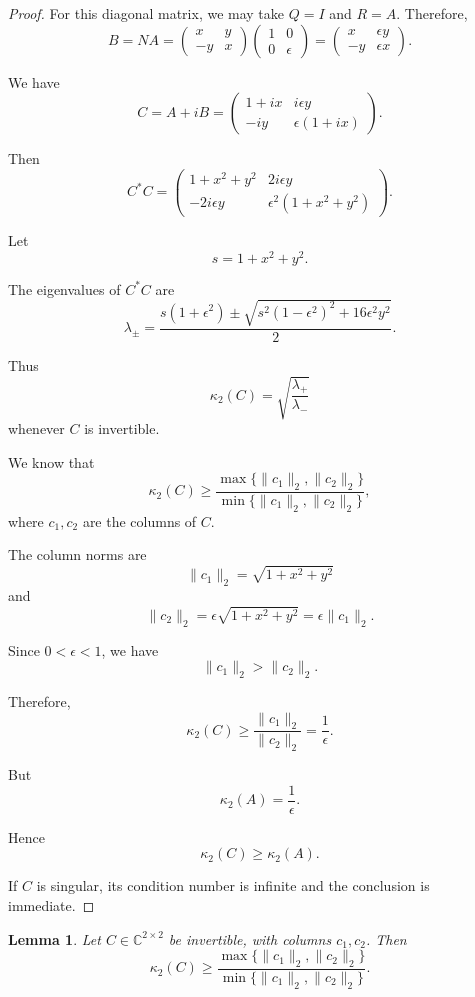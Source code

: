 \documentclass[11pt, reqno, a4paper]{amsart}
\theoremstyle{plain}
\newtheorem{lemma}[theorem]{Lemma}
\theoremstyle{definition}
\theoremstyle{remark}
\numberwithin{equation}{section}
\begin{document}
\begin{proof}
For this diagonal matrix, we may take $Q=I$ and $R=A$. Therefore,
\[
B=NA
=
\begin{pmatrix}
x&y\\
-y&x
\end{pmatrix}
\begin{pmatrix}
1&0\\
0&\epsilon
\end{pmatrix}
=
\begin{pmatrix}
x&\epsilon y\\
-y&\epsilon x
\end{pmatrix}.
\]

We have
\[
C=A+iB
=
\begin{pmatrix}
1+ix&i\epsilon y\\
-iy&\epsilon(1+ix)
\end{pmatrix}.
\]

Then
\[
C^*C
=
\begin{pmatrix}
1+x^2+y^2&2i\epsilon y\\
-2i\epsilon y&\epsilon^2(1+x^2+y^2)
\end{pmatrix}.
\]

Let
\[
s=1+x^2+y^2.
\]

The eigenvalues of $C^*C$ are
\[
\boxed{
\lambda_\pm
=
\frac{
s(1+\epsilon^2)
\pm
\sqrt{
s^2(1-\epsilon^2)^2+16\epsilon^2y^2
}
}{2}.
}
\]

Thus
\[
\kappa_2(C)=\sqrt{\frac{\lambda_+}{\lambda_-}}
\]
whenever $C$ is invertible.

We know that
\[
\kappa_2(C)
\geq
\frac{\max\{\|c_1\|_2,\|c_2\|_2\}}
{\min\{\|c_1\|_2,\|c_2\|_2\}},
\]
where $c_1,c_2$ are the columns of $C$.

The column norms are
\[
\|c_1\|_2
=
\sqrt{1+x^2+y^2}
\]
and
\[
\|c_2\|_2
=
\epsilon\sqrt{1+x^2+y^2}
=
\epsilon\|c_1\|_2.
\]

Since $0<\epsilon<1$, we have
\[
\|c_1\|_2>\|c_2\|_2.
\]

Therefore,
\[
\kappa_2(C)
\geq
\frac{\|c_1\|_2}{\|c_2\|_2}
=
\frac{1}{\epsilon}.
\]

But
\[
\kappa_2(A)=\frac{1}{\epsilon}.
\]

Hence
\[
\boxed{\kappa_2(C)\geq\kappa_2(A).}
\]

If $C$ is singular, its condition number is infinite and the conclusion is immediate.
\end{proof}

\begin{lemma}
Let $C\in\mathbb{C}^{2\times2}$ be invertible, with columns $c_1,c_2$. Then
\[
\kappa_2(C)
\geq
\frac{\max\{\|c_1\|_2,\|c_2\|_2\}}
{\min\{\|c_1\|_2,\|c_2\|_2\}}.
\]
\end{lemma}
\end{document}
